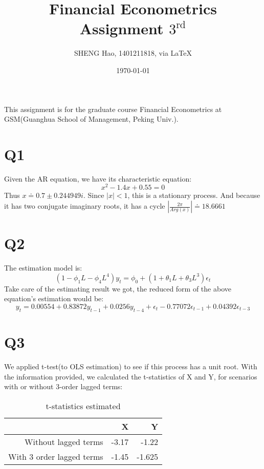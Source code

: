 \documentclass{article}
\begin{document}
\title{Financial Econometrics\\Assignment $3^{\text{rd}}$}
\author{{\normalsize SHENG Hao, 1401211818, via \LaTeX}}
\date{\today}

\maketitle

\def \Pr{{\rm Pr}}
\baselineskip 0.6cm

 This assignment is for the graduate course Financial Econometrics at GSM(Guanghua School of Management, Peking Univ.). 


\section{Q1}
Given the AR equation, we have its characteristic equation:
\begin{equation}
  x^2-1.4x+0.55=0
\end{equation}
Thus $x \doteq 0.7\pm0.244949 i$.
Since $|x|<1$, this is a stationary process. And because it has two conjugate imaginary roots, it has a cycle $|\frac{2 \pi} {Arg(x)}| \doteq 18.6661$


\section{Q2}
The estimation model is:
\begin{equation}
  (1-\phi_1 L - \phi_4 L^4)y_t = \phi_0 + (1+\theta_1 L + \theta_3 L^3)\epsilon_t
\end{equation}
Take care of the estimating result we got, the reduced form of the above equation's estimation would be:
\begin{equation}
  y_t=0.00554+0.83872y_{t-1}+0.0256y_{t-4}+\epsilon_{t}-0.77072\epsilon_{t-1} +0.04392\epsilon_{t-3}
\end{equation}
\section{Q3}
We applied t-test(to OLS estimation) to see if this process has a unit root. With the information provided, we calculated the t-statistics of X and Y, for scenarios with or without 3-order lagged terms:
\begin{table}
\centering
\begin{tabular}{r|rr}

           &          X &          Y \\
\hline
\hline
Without lagged terms &      -3.17 &       -1.22 \\

With 3 order lagged terms &       -1.45 &      -1.625 \\
\hline
\end{tabular}  
\caption{t-statistics estimated}
\end{table}
\end{document}

